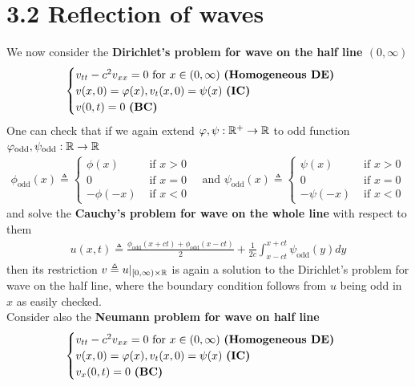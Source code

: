 \documentclass{report}
\begin{document}
\section{3.2 Reflection of waves}
\begin{mdframed}
We now consider the \textbf{Dirichlet's problem for wave on the half line $(0,\infty)$} 
\begin{align*}
\begin{cases}
 v_{tt}-c^2v_{xx}=0\text{ for }x\in (0,\infty)\text{ \textbf{(Homogeneous DE)} } \\
v(x,0)=\phi (x),v_t(x,0)=\psi (x)\text{ \textbf{(IC)} } \\
v(0,t)=0\text{ \textbf{(BC)} }
\end{cases}
\end{align*}
One can check that if we again extend $\phi,\psi:\R^+\rightarrow \R$ to odd function $\phi_{\operatorname{odd}},\psi_{\operatorname{odd}}:\R\rightarrow \R$
\begin{align*}
\phi_{\operatorname{odd}}(x)\triangleq \begin{cases}
  \phi(x)& \text{ if $x>0$ }\\
  0& \text{ if $x=0$ }\\
  -\phi (-x)& \text{ if $x<0$ }
\end{cases}\text{ and }\psi_{\operatorname{odd}}(x)\triangleq \begin{cases}
  \psi(x)& \text{ if $x>0$ }\\
  0& \text{ if $x=0$ }\\
  -\psi (-x)& \text{ if $x<0$ }
\end{cases}
\end{align*}
and solve the \textbf{Cauchy's problem for wave on the whole line} with respect to them 
\begin{align*}
u(x,t)\triangleq \frac{\phi_{\operatorname{odd}} (x+ct)+\phi_{\operatorname{odd}} (x-ct)}{2}+ \frac{1}{2c}\int^{x+ct}_{x-ct}\psi_{\operatorname{odd}}(y)dy
\end{align*}
then its restriction $v\triangleq u|_{[0,\infty)\times \R}$ is again a solution to the Dirichlet's problem for wave on the half line, where the boundary condition follows from $u$ being odd in $x$ as easily checked. \\

Consider also the \textbf{Neumann problem for wave on half line}
\begin{align*}
\begin{cases}
  v_{tt}-c^2v_{xx}=0\text{ for }x\in (0,\infty)\text{ \textbf{(Homogeneous DE)} } \\
v(x,0)=\phi (x),v_t(x,0)=\psi (x)\text{ \textbf{(IC)} } \\
v_x(0,t)=0\text{ \textbf{(BC)} }
\end{cases}
\end{align*}
\end{mdframed}
\end{document}
